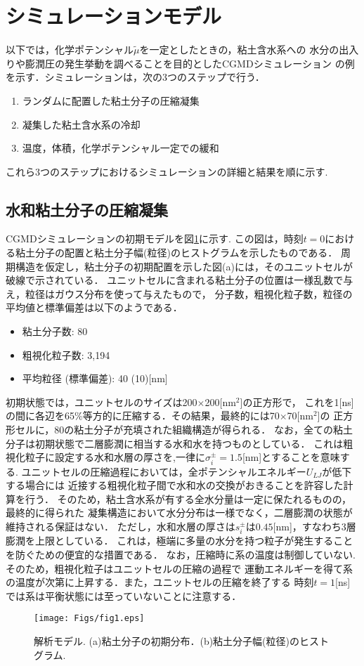 \section{シミュレーションモデル}
以下では，化学ポテンシャル$\tilde \mu$を一定としたときの，粘土含水系への
水分の出入りや膨潤圧の発生挙動を調べることを目的としたCGMDシミュレーション
の例を示す．シミュレーションは，次の3つのステップで行う．
\begin{enumerate}
\item
	ランダムに配置した粘土分子の圧縮凝集
\item
	凝集した粘土含水系の冷却
\item
	温度，体積，化学ポテンシャル一定での緩和
\end{enumerate}
これら3つのステップにおけるシミュレーションの詳細と結果を順に示す.
\subsection{水和粘土分子の圧縮凝集}
CGMDシミュレーションの初期モデルを図\ref{fig:fig1}に示す.
この図は，時刻$t=0$における粘土分子の配置と粘土分子幅(粒径)のヒストグラムを示したものである．
周期構造を仮定し，粘土分子の初期配置を示した図(a)には，そのユニットセルが破線で示されている．
ユニットセルに含まれる粘土分子の位置は一様乱数で与え，粒径はガウス分布を使って与えたもので，
分子数，粗視化粒子数，粒径の平均値と標準偏差は以下のようである．
\begin{itemize}
	\item 粘土分子数: 80
	\item 粗視化粒子数: 3,194
	\item 平均粒径 (標準偏差): 40 (10)[{\rm nm}]
\end{itemize}
初期状態では，ユニットセルのサイズは200$\times$200[nm$^2$]の正方形で，
これを1[ns]の間に各辺を65\%等方的に圧縮する．その結果，最終的には70$\times$70[nm$^2$]の
正方形セルに，80の粘土分子が充填された組織構造が得られる．
なお，全ての粘土分子は初期状態で二層膨潤に相当する水和水を持つものとしている．
これは粗視化粒子に設定する水和水層の厚さを,一律に$\sigma_i^\pm=1.5$[nm]とすることを意味する.
ユニットセルの圧縮過程においては，全ポテンシャルエネルギー$U_{LJ}$が低下する場合には
近接する粗視化粒子間で水和水の交換がおきることを許容した計算を行う．
そのため，粘土含水系が有する全水分量は一定に保たれるものの，最終的に得られた
凝集構造において水分分布は一様でなく，二層膨潤の状態が維持される保証はない．
ただし，水和水層の厚さは$s_i^\pm$は$0.45$[nm]，すなわち3層膨潤を上限としている．
これは，極端に多量の水分を持つ粒子が発生することを防ぐための便宜的な措置である．
%
なお，圧縮時に系の温度は制御していない.そのため，粗視化粒子はユニットセルの圧縮の過程で
運動エネルギーを得て系の温度が次第に上昇する．また，ユニットセルの圧縮を終了する
時刻$t=1$[ns]では系は平衡状態には至っていないことに注意する．
\begin{figure}[h]
	\begin{center}
	\texttt{[image: Figs/fig1.eps]} 
	\end{center}
	\caption{
		解析モデル. (a)粘土分子の初期分布．(b)粘土分子幅(粒径)のヒストグラム. 
	} 
	\label{fig:fig1}
\end{figure}

